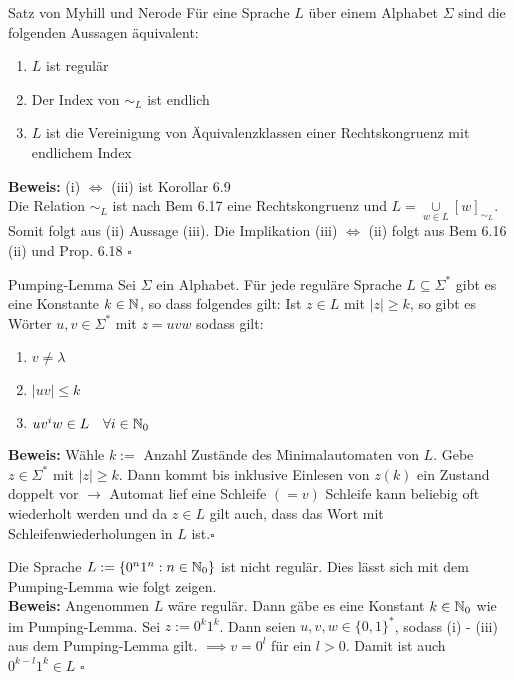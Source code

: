 \begin{satz}{Satz von Myhill und Nerode}
	Für eine Sprache $L$ über einem Alphabet $\Sigma$ sind die folgenden Aussagen äquivalent:
	\begin{enumerate}[label=(\roman*)]
		\item $L$ ist regulär
		\item Der Index von $\sim_L$ ist endlich
		\item $L$ ist die Vereinigung von Äquivalenzklassen einer Rechtskongruenz mit endlichem Index
	\end{enumerate}
	
	\textbf{Beweis:} (i) $\iff$ (iii) ist Korollar 6.9\\
	Die Relation $\sim_L$ ist nach Bem 6.17 eine Rechtskongruenz und $L = \underset{w \in L}{\cup}[w]_{\sim_L}$. Somit folgt aus (ii) Aussage (iii). Die Implikation (iii) $\iff$ (ii) folgt aus Bem 6.16 (ii) und Prop. 6.18 \hspace*{\fill}$\square$
\end{satz}

\begin{satz}{Pumping-Lemma}
	Sei $\Sigma$ ein Alphabet. Für jede reguläre Sprache $L \subseteq \Sigma^*$ gibt es eine Konstante $k \in \mathbb{N}$, so dass folgendes gilt: Ist $z \in L$ mit $|z| \geq k$, so gibt es Wörter $u, v \in \Sigma^*$ mit $z = uvw$ sodass gilt:
	\begin{enumerate}
		\item $v \neq \lambda$
		\item $|uv| \leq k$
		\item $u v^i w \in L \quad \forall i \in \mathbb{N}_0$
	\end{enumerate}
	
	\textbf{Beweis:} Wähle $k := $ Anzahl Zustände des Minimalautomaten von $L$. Gebe $z \in \Sigma^*$ mit $|z| \geq k$. Dann kommt bis inklusive Einlesen von $z(k)$ ein Zustand doppelt vor $\to$ Automat lief eine Schleife $(=v)$ Schleife kann beliebig oft wiederholt werden und da $z \in L$ gilt auch, dass das Wort mit Schleifenwiederholungen in $L$ ist.\hspace*{\fill}$\square$
\end{satz}

\begin{exam}
	Die Sprache $L := \{0^n 1^n : n \in \mathbb{N}_0\}$ ist nicht regulär. Dies lässt sich mit dem Pumping-Lemma wie folgt zeigen.\\
	
	\textbf{Beweis:} Angenommen $L$ wäre regulär. Dann gäbe es eine Konstant $k \in \mathbb{N}_0$ wie im Pumping-Lemma. Sei $z := 0^k 1^k$. Dann seien $u, v, w \in \{0, 1\}^*$, sodass (i) - (iii) aus dem Pumping-Lemma gilt. $\implies v = 0^l$ für ein $l > 0$. Damit ist auch $0^{k-l} 1^k \in L$ \lightning \hspace*{\fill}$\square$
\end{exam}

